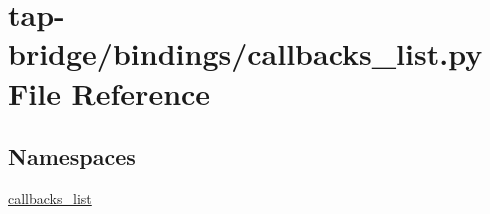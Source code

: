 \hypertarget{tap-bridge_2bindings_2callbacks__list_8py}{}\section{tap-\/bridge/bindings/callbacks\+\_\+list.py File Reference}
\label{tap-bridge_2bindings_2callbacks__list_8py}
\subsection*{Namespaces}
\begin{DoxyCompactItemize}
\item 
 \hyperlink{namespacecallbacks__list}{callbacks\+\_\+list}
\end{DoxyCompactItemize}
